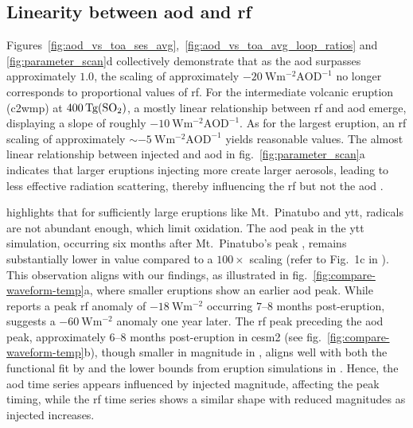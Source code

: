 \documentclass{ametsocV6.1}
\newcommand{\iso}[1][i]{{#1}njected \ce{SO2}}
\begin{document}
\subsection{Linearity between \gls{aod} and \gls{rf}}

Figures~\ref{fig:aod_vs_toa_ses_avg},~\ref{fig:aod_vs_toa_avg_loop_ratios} and
\ref{fig:parameter_scan}d collectively demonstrate that as the \gls{aod} surpasses
approximately \(1.0\), the scaling of approximately
\(\SI{-20}{\watt\metre^{-2}\mathrm{AOD}^{-1}}\) no longer corresponds to proportional
values of \gls{rf}. For the intermediate volcanic eruption (\gls{c2wmp}) at
\(\SI{400}{\tera\gram(\ce{SO2})}\), a mostly linear relationship between \gls{rf} and
\gls{aod} emerge, displaying a slope of roughly
\(\SI{-10}{\watt\metre^{-2}\mathrm{AOD}^{-1}}\). As for the largest eruption, an
\gls{rf} scaling of approximately \(\sim \SI{-5}{\watt\metre^{-2}\mathrm{AOD}^{-1}}\)
yields reasonable values. The almost linear relationship between \iso{} and \gls{aod} in
fig.~\ref{fig:parameter_scan}a indicates that larger eruptions injecting more 
create larger aerosols, leading to less effective radiation scattering, thereby
influencing the \gls{rf} but not the \gls{aod} \citep{english2013, timmreck2010,
  timmreck2018}.

\citet{timmreck2010} highlights that for sufficiently large eruptions like Mt.\ Pinatubo
and \gls{ytt},  radicals are not abundant enough, which limit  oxidation.
The \gls{aod} peak in the \gls{ytt} simulation, occurring six months after Mt.\
Pinatubo's peak \citet{timmreck2010}, remains substantially lower in value compared to a
\(100\times\) scaling (refer to Fig.\ 1c in \citet{timmreck2010}). This observation
aligns with our findings, as illustrated in fig.~\ref{fig:compare-waveform-temp}a, where
smaller eruptions show an earlier \gls{aod} peak. While \citet{timmreck2010} reports a
peak \gls{rf} anomaly of \(\SI{-18}{\watt\metre^{-2}}\) occurring \(7\)--\(8\) months
post-eruption, \citet{jones2005} suggests a \(\SI{-60}{\watt\metre^{-2}}\) anomaly one
year later. The \gls{rf} peak preceding the \gls{aod} peak, approximately \(6\)--\(8\)
months post-eruption in \gls{cesm2} (see fig.~\ref{fig:compare-waveform-temp}b), though
smaller in magnitude in \citet{timmreck2010}, aligns well with both the functional fit
by \citet{niemeier2015} and the lower bounds from eruption simulations in
\citet{marshall2020}. Hence, the \gls{aod} time series appears influenced by \iso{}
magnitude, affecting the peak timing, while the \gls{rf} time series shows a similar
shape with reduced magnitudes as \iso{} increases.
\end{document}
